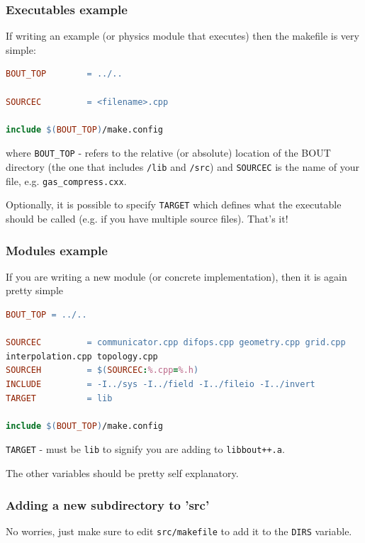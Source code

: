 \documentclass[12pt]{article}
\begin{document}
\subsubsection{Executables example}
%
\label{sec:executables}
%
If writing an example (or physics module that executes) then the makefile is
very simple:
%
\begin{lstlisting}[language=make,numbers=none]
BOUT_TOP        = ../..

SOURCEC         = <filename>.cpp

include $(BOUT_TOP)/make.config
\end{lstlisting}
%
where \texttt{BOUT\_TOP} - refers to the relative (or absolute) location of the
BOUT directory (the one that includes \texttt{/lib} and \texttt{/src}) and
\texttt{SOURCEC}  is the name of your file, e.g. \texttt{gas\_compress.cxx}.

Optionally, it is possible to specify \texttt{TARGET} which defines what the
executable should be called (e.g. if you have multiple source files). That's
it!


\subsubsection{Modules example}
%
\label{sec:modules}
%
If you are writing a new module (or concrete implementation), then it is again
pretty simple
%
\begin{lstlisting}[language=make,numbers=none]
BOUT_TOP = ../..

SOURCEC         = communicator.cpp difops.cpp geometry.cpp grid.cpp
interpolation.cpp topology.cpp
SOURCEH         = $(SOURCEC:%.cpp=%.h)
INCLUDE         = -I../sys -I../field -I../fileio -I../invert
TARGET          = lib

include $(BOUT_TOP)/make.config
\end{lstlisting}
%
\texttt{TARGET} - must be \texttt{lib} to signify you are adding to
\texttt{libbout++.a}.

The other variables should be pretty self explanatory.


\subsubsection{Adding a new subdirectory to 'src'}
%
No worries, just make sure to edit \texttt{src/makefile} to add it to the
\texttt{DIRS} variable.
\end{document}
